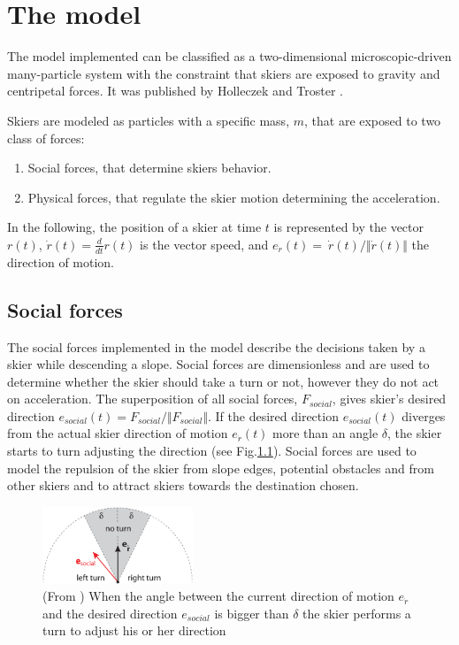 \documentclass[12pt,a4paper,twoside]{book}
\begin{document}
\chapter{The model}\label{model}
The model implemented can be classified as a two-dimensional microscopic-driven many-particle system with the constraint that skiers are exposed to gravity and centripetal forces. It was published by Holleczek and Troster \cite{hol2012}.

Skiers are modeled as particles with a specific mass, $m$, that are exposed to two class of forces:\begin{enumerate}
\item Social forces, that determine skiers behavior.
\item Physical forces, that regulate the skier motion determining the acceleration.
\end{enumerate}
In the following, the position of a skier at time $t$ is represented by the vector $r(t)$, $\dot{r}(t)=\frac{d}{dt}r(t)$ is the vector speed, and $e_{\dot{r}}(t)=\ \dot{r}(t) / \Vert \dot{r}(t)\Vert$ the direction of motion.

\section{Social forces}
The social forces implemented in the model describe the decisions taken by a skier while descending a slope. Social forces are dimensionless and are used to determine whether the skier should take a turn or not, however they do not act on acceleration. The superposition of all social forces, $F_{social}$, gives skier's desired direction $e_{social}(t)=F_{social} / \Vert F_{social} \Vert$. If the desired direction $e_{social}(t)$ diverges from the actual skier direction of motion $e_{\dot{r}}(t)$ more than an angle ${\delta}$, the skier starts to turn adjusting the direction (see Fig.\ref{start_turn_pic}). Social forces are used to model the repulsion of the skier from slope edges, potential obstacles and from other skiers and to attract skiers towards the destination chosen.

\begin{figure}
  \begin{center}
    \includegraphics[width=0.4\textwidth]{images/start_turn_pic.eps}
    \caption{(From \cite{hol2012}) When the angle between the current direction of motion $e_{\dot{r}}$ and the desired direction $e_{social}$ is bigger than $\delta$ the skier performs a turn to adjust his or her direction}\label{start_turn_pic}
  \end{center}
\end{figure}
\end{document}
